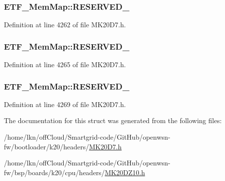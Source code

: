 \subsubsection[{\texorpdfstring{R\+E\+S\+E\+R\+V\+E\+D\+\_\+2}{RESERVED_2}}]{ E\+T\+F\+\_\+\+Mem\+Map\+::\+R\+E\+S\+E\+R\+V\+E\+D\+\_}\hypertarget{struct_e_t_f___mem_map_a331ff04d7effeebbc5172f220f930a4f}{}\label{struct_e_t_f___mem_map_a331ff04d7effeebbc5172f220f930a4f}


Definition at line 4262 of file M\+K20\+D7.\+h.

\subsubsection[{\texorpdfstring{R\+E\+S\+E\+R\+V\+E\+D\+\_\+3}{RESERVED_3}}]{ E\+T\+F\+\_\+\+Mem\+Map\+::\+R\+E\+S\+E\+R\+V\+E\+D\+\_}\hypertarget{struct_e_t_f___mem_map_ad639e21cec26098c785f9bd2e2da6c70}{}\label{struct_e_t_f___mem_map_ad639e21cec26098c785f9bd2e2da6c70}


Definition at line 4265 of file M\+K20\+D7.\+h.

\subsubsection[{\texorpdfstring{R\+E\+S\+E\+R\+V\+E\+D\+\_\+4}{RESERVED_4}}]{ E\+T\+F\+\_\+\+Mem\+Map\+::\+R\+E\+S\+E\+R\+V\+E\+D\+\_}\hypertarget{struct_e_t_f___mem_map_ac140986b7fb07fbea4a9c32b9529d725}{}\label{struct_e_t_f___mem_map_ac140986b7fb07fbea4a9c32b9529d725}


Definition at line 4269 of file M\+K20\+D7.\+h.



The documentation for this struct was generated from the following files\+:\begin{DoxyCompactItemize}
\item 
/home/lkn/off\+Cloud/\+Smartgrid-\/code/\+Git\+Hub/openwsn-\/fw/bootloader/k20/headers/\hyperlink{bootloader_2k20_2headers_2_m_k20_d7_8h}{M\+K20\+D7.\+h}\item 
/home/lkn/off\+Cloud/\+Smartgrid-\/code/\+Git\+Hub/openwsn-\/fw/bsp/boards/k20/cpu/headers/\hyperlink{_m_k20_d_z10_8h}{M\+K20\+D\+Z10.\+h}\end{DoxyCompactItemize}
